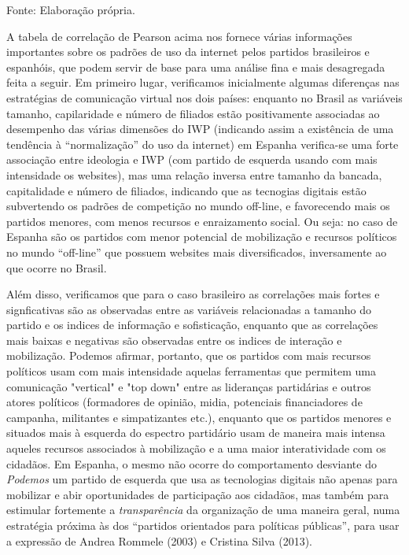 Fonte: Elaboração própria.

A tabela de correlação de Pearson acima nos fornece várias informações
importantes sobre os padrões de uso da internet pelos partidos
brasileiros e espanhóis, que podem servir de base para uma análise fina
e mais desagregada feita a seguir. Em primeiro lugar, verificamos
inicialmente algumas diferenças nas estratégias de comunicação virtual
nos dois países: enquanto no Brasil as variáveis tamanho, capilaridade e
número de filiados estão positivamente associadas ao desempenho das
várias dimensões do IWP (indicando assim a existência de uma tendência à
``normalização'' do uso da internet) em Espanha verifica-se uma forte
associação entre ideologia e IWP (com partido de esquerda usando com
mais intensidade os websites), mas uma relação inversa entre tamanho da
bancada, capitalidade e número de filiados, indicando que as tecnogias
digitais estão subvertendo os padrões de competição no mundo off-line, e
favorecendo mais os partidos menores, com menos recursos e enraizamento
social. Ou seja: no caso de Espanha são os partidos com menor potencial
de mobilização e recursos políticos no mundo ``off-line'' que possuem
websites mais diversificados, inversamente ao que ocorre no Brasil.

Além disso, verificamos que para o caso brasileiro as correlações mais
fortes e signficativas são as observadas entre as variáveis relacionadas
a tamanho do partido e os indices de informação e sofisticação, enquanto
que as correlações mais baixas e negativas são observadas entre os
indices de interação e mobilização. Podemos afirmar, portanto, que os
partidos com mais recursos políticos usam com mais intensidade aquelas
ferramentas que permitem uma comunicação "vertical" e "top down" entre
as lideranças partidárias e outros atores políticos (formadores de
opinião, midia, potenciais financiadores de campanha, militantes e
simpatizantes etc.), enquanto que os partidos menores e situados mais à
esquerda do espectro partidário usam de maneira mais intensa aqueles
recursos associados à mobilização e a uma maior interatividade com os
cidadãos. Em Espanha, o mesmo não ocorre do comportamento desviante do
\emph{Podemos} um partido de esquerda que usa as tecnologias digitais
não apenas para mobilizar e abir oportunidades de participação aos
cidadãos, mas também para estimular fortemente a \emph{transparência} da
organização de uma maneira geral, numa estratégia próxima às dos
``partidos orientados para políticas públicas'', para usar a expressão
de Andrea Rommele (2003) e Cristina Silva (2013).

